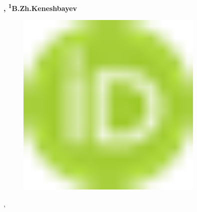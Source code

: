 {\bfseries ,
\textsuperscript{1}B.Zh.Keneshbayev}
\begin{figure}[H]
	\centering
	\includegraphics[width=0.8\textwidth]{media/ekon2/image1}
	\caption*{}
\end{figure}
,

